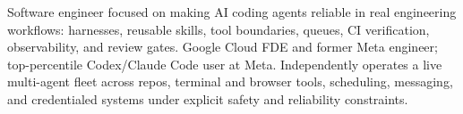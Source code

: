 


Software engineer focused on making AI coding agents reliable in real engineering workflows: harnesses, reusable skills, tool boundaries, queues, CI verification, observability, and review gates. Google Cloud FDE and former Meta engineer; top-percentile Codex/Claude Code user at Meta. Independently operates a live multi-agent fleet across repos, terminal and browser tools, scheduling, messaging, and credentialed systems under explicit safety and reliability constraints.







